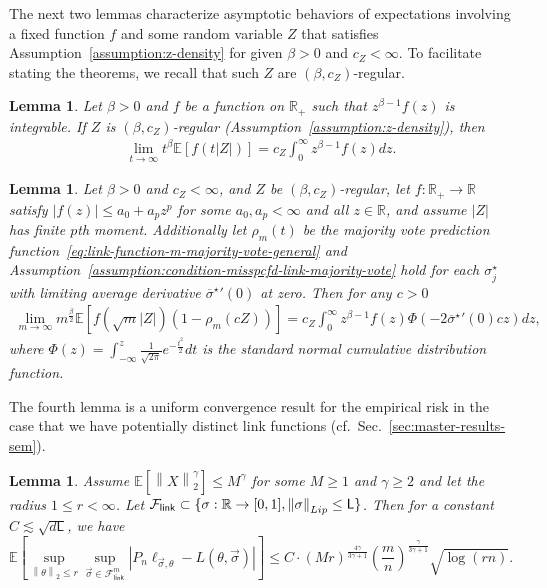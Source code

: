 \documentclass[11pt]{article}
\newcommand{\Ep}{\mathbb{E}}
\newcommand{\E}{\mathbb{E}}
\newcommand{\R}{\mathbb{R}} %
\newcommand{\norm}[1]{\left\|{#1}\right\|} %
\newcommand{\wb}[1]{\overline{#1}}
\newcommand{\Flink}{\mathcal{F}_{\mathsf{link}}}
\newcommand{\lipconst}{\mathsf{L}}
\newcommand{\loss}{\ell}
\newcommand{\ltwo}[1]{\norm{#1}_2} %
\newcommand{\<}{\langle} %
\renewcommand{\>}{\rangle}
\newcommand{\lipnorm}[1]{\norm{#1}_{\textup{Lip}}}
\newcommand{\opt}{^\star}
\newtheorem{lemma}[claim]{Lemma}
\begin{document}
The next two lemmas characterize asymptotic behaviors of expectations
involving a fixed function $f$ and some random variable $Z$ that satisfies
Assumption~\ref{assumption:z-density} for given $\beta>0$ and $c_Z <
\infty$. To facilitate stating the theorems, we recall
that such $Z$ are $(\beta,
c_Z)$-regular.
\begin{lemma} \label{lem:t-Z-integral-noise}
  Let $\beta > 0$ and $f$ be a function on $\R_+$ such that
  $z^{\beta-1}f(z)$ is integrable. If $Z$ is $(\beta,
  c_Z)$-regular (Assumption~\ref{assumption:z-density}), then
  \begin{align*}
    \lim_{t \to \infty} t^\beta \Ep [f(t|Z|)] =  c_Z \int_{0}^{\infty} z^{\beta - 1} f(z) dz.
  \end{align*}
\end{lemma}

\begin{lemma} \label{lem:m-rho-integral-noise-general}
  Let $\beta > 0$ and $c_Z < \infty$, and $Z$ be $(\beta, c_Z)$-regular, let
  $f : \R_+ \to \R$ satisfy $|f(z)| \leq a_0 + a_p z^p$ for some $a_0, a_p <
  \infty$ and all $z \in \R$, and assume $|Z|$ has finite $p$th
  moment. Additionally let $\rho_m(t)$ be the majority vote prediction
  function~\eqref{eq:link-function-m-majority-vote-general} and
  Assumption~\ref{assumption:condition-misspcfd-link-majority-vote} hold for
  each $\sigma_j\opt$ with limiting average derivative
  ${\wb{\sigma}\opt}'(0)$ at zero. Then for any $c > 0$
  \begin{align*}
    \lim_{m \to \infty} m^{\frac{\beta}{2}}\Ep \left[f(\sqrt{m}|Z|) (1 - \rho_m(cZ))\right] = c_Z \int_0^\infty z^{\beta - 1} f(z) \Phi \left(-2 {\wb{\sigma}\opt}'(0) cz\right) dz,
  \end{align*}
  where $\Phi(z) = \int_{-\infty}^z \frac{1}{\sqrt{2 \pi}}
  e^{-\frac{t^2}{2}}dt$ is the standard normal cumulative distribution function.
\end{lemma}

The fourth lemma is a uniform convergence result for the empirical risk in
the case that we have potentially distinct link functions
(cf.~Sec.~\ref{sec:master-results-sem}).
\begin{lemma}
  \label{lemma:rademacher-symmetrization}
  Assume $\E[\ltwo{X}^{\gamma}] \le M^\gamma$ for some $M \ge 1$ and $\gamma
  \ge 2$ and let the radius $1 \le r < \infty$. Let $\Flink \subset \{\sigma
  : \R \to [0, 1], \lipnorm{\sigma} \le \lipconst\}$.  Then for a constant
  $C \lesssim \sqrt{d \lipconst}$, we have
  \begin{equation*}
    \E\left[\sup_{\ltwo{\theta} \le r}
      \sup_{\vec{\sigma} \in \Flink^m} |P_n \loss_{\vec{\sigma},\theta} - L(\theta,
      \vec{\sigma})|\right]
    \le C \cdot
    (M r)^\frac{4\gamma}{3\gamma + 1} 
    \left(\frac{m}{n}\right)^\frac{\gamma}{3\gamma + 1}
    \sqrt{\log(rn)}.
  \end{equation*}
\end{lemma}
\end{document}
